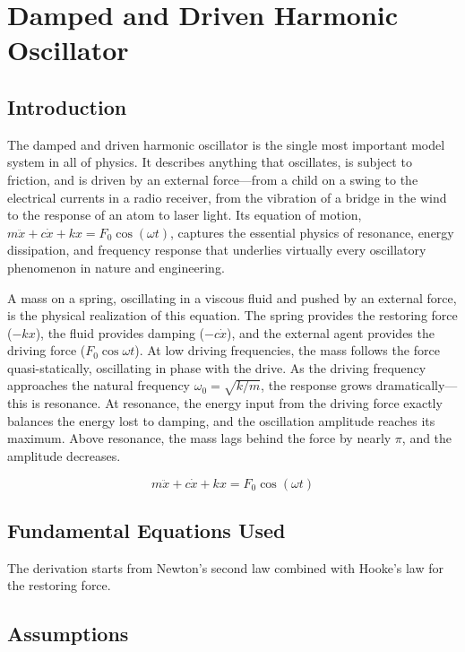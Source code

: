 \chapter{Damped and Driven Harmonic Oscillator}

\section*{Introduction}

The damped and driven harmonic oscillator is the single most important model system in all of physics. It describes anything that oscillates, is subject to friction, and is driven by an external force---from a child on a swing to the electrical currents in a radio receiver, from the vibration of a bridge in the wind to the response of an atom to laser light. Its equation of motion, $m\ddot{x} + c\dot{x} + kx = F_0\cos(\omega t)$, captures the essential physics of resonance, energy dissipation, and frequency response that underlies virtually every oscillatory phenomenon in nature and engineering.

A mass on a spring, oscillating in a viscous fluid and pushed by an external force, is the physical realization of this equation. The spring provides the restoring force ($-kx$), the fluid provides damping ($-c\dot{x}$), and the external agent provides the driving force ($F_0\cos\omega t$). At low driving frequencies, the mass follows the force quasi-statically, oscillating in phase with the drive. As the driving frequency approaches the natural frequency $\omega_0 = \sqrt{k/m}$, the response grows dramatically---this is resonance. At resonance, the energy input from the driving force exactly balances the energy lost to damping, and the oscillation amplitude reaches its maximum. Above resonance, the mass lags behind the force by nearly $\pi$, and the amplitude decreases.


\begin{equation}
m\ddot{x} + c\dot{x} + kx = F_0\cos(\omega t)
\end{equation}

\section*{Fundamental Equations Used}

The derivation starts from Newton's second law combined with Hooke's law for the restoring force.

\section*{Assumptions}

